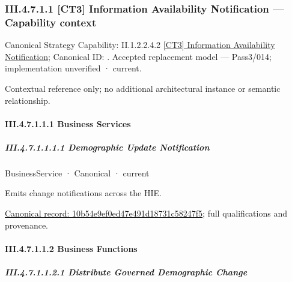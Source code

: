\subsubsection*{III.4.7.1.1 [CT3] Information Availability Notification — Capability context}
\label{navigation:III.4.7.1.1}

{\small Canonical Strategy Capability: II.1.2.2.4.2 \hyperref[element:c159dcc35e0f43418af6c6176e271ca7]{[CT3] Information Availability Notification}; Canonical ID: \texttt{}. Accepted replacement model — Pass3/014; implementation unverified · current.}\par
Contextual reference only; no additional architectural instance or semantic relationship.\par
\paragraph*{III.4.7.1.1.1 Business Services}
\label{navigation:III.4.7.1.1.1}

\subparagraph*{III.4.7.1.1.1.1 Demographic Update Notification}
\label{navigation:III.4.7.1.1.1.1}

\label{element:10b54e9ef0ed47e491d18731c58247f5}
{\small BusinessService · Canonical · current}\par

Emits change notifications across the HIE.


{\footnotesize \href{../../../../../../../../continuum/business/business-service/10b54e9ef0ed47e491d18731c58247f5.md}{Canonical record: 10b54e9ef0ed47e491d18731c58247f5}; full qualifications and provenance.}\par
\paragraph*{III.4.7.1.1.2 Business Functions}
\label{navigation:III.4.7.1.1.2}

\subparagraph*{III.4.7.1.1.2.1 Distribute Governed Demographic Change}
\label{navigation:III.4.7.1.1.2.1}

